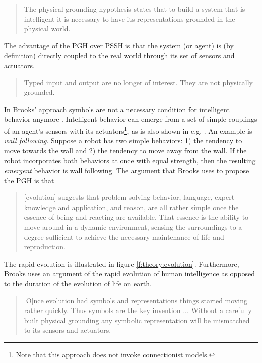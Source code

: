 \begin{quote}
The physical grounding hypothesis states that to build a system that is intelligent it is necessary to have its representations grounded in the physical world. \cite{brooks:1990}
\end{quote}

The advantage of the PGH over PSSH is that the system (or agent) is (by definition) directly coupled to the real world through its set of sensors and actuators. 

\begin{quote}
Typed input and output are no longer of interest. They are not physically grounded. \cite{brooks:1990}
\end{quote}

In Brooks' approach symbols are not a necessary condition for intelligent behavior anymore \cite{brooks:1990,brooks:1991}. Intelligent behavior can emerge from a set of simple couplings of an agent's sensors with its actuators\footnote{Note that this approach does not invoke connectionist models.}, as is also shown in e.g. \cite{steelsbrooks:1993,steels:1994,steels:1996c}. An example is {\em wall following}. Suppose a robot has two simple behaviors: 1) the tendency to move towards the wall and 2) the tendency to move away from the wall. If the robot incorporates both behaviors at once with equal strength, then the resulting {\em emergent} behavior is wall following. The argument that Brooks uses to propose the PGH is that

\begin{quote}
[evolution] suggests that problem solving behavior, language, expert knowledge and application, and reason, are all rather simple once the essence of being and reacting are available. That essence is the ability to move around in a dynamic environment, sensing the surroundings to a degree sufficient to achieve the necessary maintenance of life and reproduction. \cite{brooks:1990}
\end{quote}

\n
The rapid evolution is illustrated in figure \ref{f:theory:evolution}. Furthermore, Brooks uses an argument of the rapid evolution of human intelligence as opposed to the duration of the evolution of life on earth.

\begin{quote}
[O]nce evolution had symbols and representations things started moving rather quickly. Thus symbols are the key invention ... Without a carefully built physical grounding any symbolic representation will be mismatched to its sensors and actuators. \cite{brooks:1990}
\end{quote}

